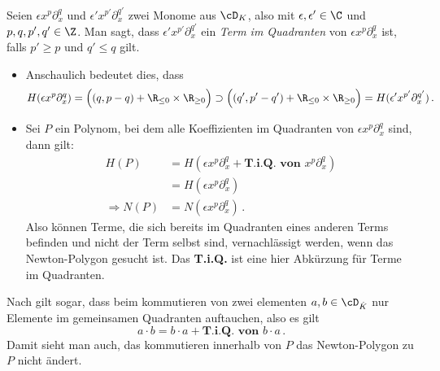 \begin{defn}
Seien $\epsilon x^{p}\partial_x^{q}$ und $\epsilon' x^{p'}\partial_x^{q'}$ zwei
Monome aus $\cD_{K}$, also mit $\epsilon, \epsilon'\in \C$ und $p,q,p',q'
\in \Z$. Man sagt, dass $\epsilon' x^{p'}\partial_x^{q'}$ ein \emph{Term im
Quadranten} von $\epsilon x^{p}\partial_x^{q}$ ist, falls $p'\geq p$ und
$q'\leq q$ gilt.
\begin{comment}
In einem Polynom
$P=\epsilon x^{p}\partial_x^{q}
+\sum^{n}_{k=0}\big(\sum^{\infty}_{l=-N}{\alpha_{kl}x^l\big)\partial_x^k}$,
mit $\alpha_{kl}\in \C$ sind die restlichen Monome
\emph{Terme im Quadranten} von $\epsilon x^{p}\partial_x^{q}$, falls für alle
einzelnen Monome schon Terme im Quadranten von $\epsilon x^{p}\partial_x^{q}$
sind.
\end{comment}
\end{defn}
\begin{bem}
\begin{itemize}
\item Anschaulich bedeutet dies, dass
\[
H(\epsilon x^{p}\partial_x^{q})
=\Big( (q,p-q) + \R_{\leq 0} \times \R_{\geq 0} \Big) \supset
\Big( (q',p'-q') + \R_{\leq 0} \times \R_{\geq 0} \Big)
=H(\epsilon' x^{p'}\partial_x^{q'}) \,.
\]
\item Sei $P$ ein Polynom, bei dem alle Koeffizienten im Quadranten von
$\epsilon x^{p}\partial_x^{q}$ sind, dann gilt:
\begin{align*}
H(P)&=H(\epsilon x^{p}\partial_x^{q} + \textbf{T.i.Q. von }x^{p}\partial_x^{q})
\\&=H(\epsilon x^{p}\partial_x^{q})
\\\Rightarrow N(P)&=N(\epsilon x^{p}\partial_x^{q}) \,.
\end{align*}
Also können Terme, die sich bereits im Quadranten eines anderen Terms
befinden und nicht der Term selbst sind, vernachlässigt werden, wenn das
Newton-Polygon gesucht ist. Das \textbf{T.i.Q.} ist eine hier Abkürzung für
Terme im Quadranten.
\end{itemize}
\end{bem}
\begin{bem} \label{bem:commutateWithTiQ}
Nach \cite{sabbah_cimpa90} gilt sogar, dass beim kommutieren von zwei
elementen $a,b\in\cD_{\hat K}$ nur Elemente im gemeinsamen Quadranten
auftauchen, also es gilt
\[
a\cdot b = b\cdot a +  \textbf{T.i.Q. von }b\cdot a \,.
\]
Damit sieht man auch, das kommutieren innerhalb von $P$ das Newton-Polygon zu
$P$ nicht ändert.
\end{bem}
\begin{comment}
\begin{exmp}
\[
(x^a\partial_x^b)^c
=x^{ac}\partial_x^{bc}+\textbf{T.i.Q. von }x^{ac}\partial_x^{bc}
\]
und somit gilt
\begin{align*}
N((x^a\partial_x^b)^c)
  &=N(x^{ac}\partial_x^{bc}+\textbf{T.i.Q. von }x^{ac}\partial_x^{bc})
\\&=N(x^{ac}\partial_x^{bc})
\end{align*}
\end{exmp}
\end{comment}

